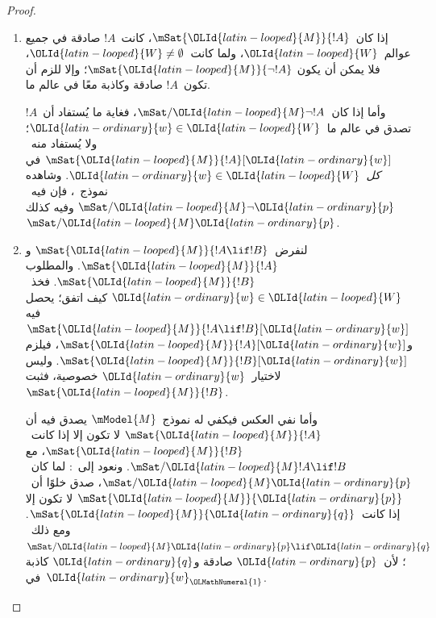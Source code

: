 \documentclass[../../../include/open-logic-section]{subfiles}
\begin{document}
\begin{proof}
  \begin{enumerate}
  \item إذا كان~$\mSat{\OLId{latin-looped}{M}}{!A}$، كانت~$!A$ صادقة في جميع عوالم~$\OLId{latin-looped}{W}$،
    ولما كانت~$\OLId{latin-looped}{W} \neq \emptyset$، فلا يمكن أن يكون
    $\mSat{\OLId{latin-looped}{M}}{\lnot!A}$؛ وإلا للزم أن تكون~$!A$ صادقة وكاذبة معًا في
    عالم ما.

    وأما إذا كان~$\mSat/{\OLId{latin-looped}{M}}{\lnot !A}$، فغاية ما يُستفاد أن~$!A$
    تصدق في عالم ما~$\OLId{latin-ordinary}{w} \in \OLId{latin-looped}{W}$؛ ولا يُستفاد منه~$\mSat{\OLId{latin-looped}{M}}{!A}[\OLId{latin-ordinary}{w}]$
    في \emph{كل}~$\OLId{latin-ordinary}{w} \in \OLId{latin-looped}{W}$. وشاهده نموذج~،
    فإن فيه~$\mSat/{\OLId{latin-looped}{M}}{\lnot \OLId{latin-ordinary}{p}}$ وفيه كذلك~$\mSat/{\OLId{latin-looped}{M}}{\OLId{latin-ordinary}{p}}$.
  \item لنفرض~$\mSat{\OLId{latin-looped}{M}}{!A \lif !B}$ و$\mSat{\OLId{latin-looped}{M}}{!A}$. والمطلوب
    $\mSat{\OLId{latin-looped}{M}}{!B}$. فخذ~$\OLId{latin-ordinary}{w} \in \OLId{latin-looped}{W}$ كيف اتفق؛ يحصل فيه
    $\mSat{\OLId{latin-looped}{M}}{!A \lif !B}[\OLId{latin-ordinary}{w}]$ و$\mSat{\OLId{latin-looped}{M}}{!A}[\OLId{latin-ordinary}{w}]$، فيلزم
    $\mSat{\OLId{latin-looped}{M}}{!B}[\OLId{latin-ordinary}{w}]$. وليس لاختيار~$\OLId{latin-ordinary}{w}$ خصوصية، فثبت
    $\mSat{\OLId{latin-looped}{M}}{!B}$.

    وأما نفي العكس فيكفي له نموذج~$\mModel{M}$ يصدق فيه أن
    $\mSat{\OLId{latin-looped}{M}}{!A}$ لا تكون إلا إذا كانت~$\mSat{\OLId{latin-looped}{M}}{!B}$، مع
    $\mSat/{\OLId{latin-looped}{M}}{!A \lif !B}$. ونعود إلى~:
    لما كان~$\mSat/{\OLId{latin-looped}{M}}{\OLId{latin-ordinary}{p}}$، صدق خلوًا أن~$\mSat{\OLId{latin-looped}{M}}{\OLId{latin-ordinary}{p}}$ لا تكون
    إلا إذا كانت~$\mSat{\OLId{latin-looped}{M}}{\OLId{latin-ordinary}{q}}$. ومع ذلك~$\mSat/{\OLId{latin-looped}{M}}{\OLId{latin-ordinary}{p} \lif \OLId{latin-ordinary}{q}}$؛
    لأن~$\OLId{latin-ordinary}{p}$ صادقة و$\OLId{latin-ordinary}{q}$ كاذبة في~$\OLId{latin-ordinary}{w}_\OLMathNumeral{1}$.
  \end{enumerate}
\end{proof}
\end{document}
